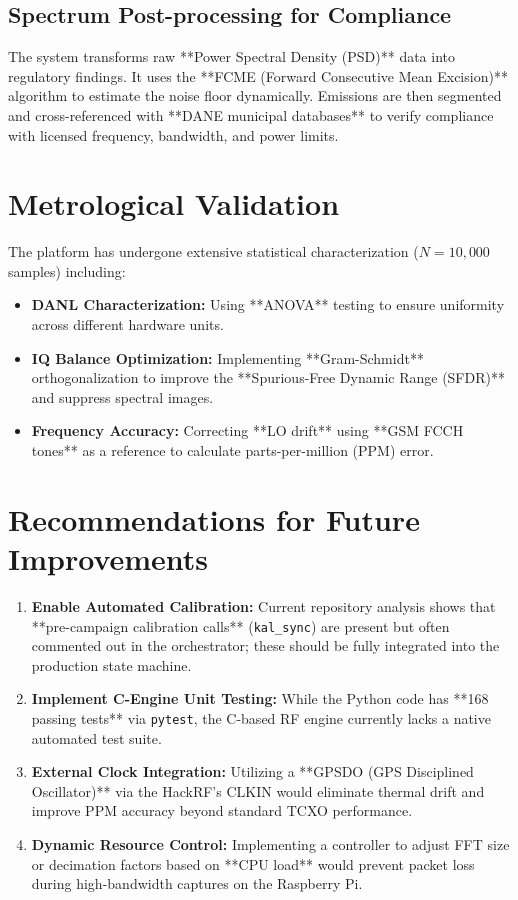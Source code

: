 \documentclass[a4paper,12pt]{article}
\begin{document}
\subsection{Spectrum Post-processing for Compliance}
The system transforms raw **Power Spectral Density (PSD)** data into regulatory findings. It uses the **FCME (Forward Consecutive Mean Excision)** algorithm to estimate the noise floor dynamically. Emissions are then segmented and cross-referenced with **DANE municipal databases** to verify compliance with licensed frequency, bandwidth, and power limits.

\section{Metrological Validation}
The platform has undergone extensive statistical characterization ($N=10,000$ samples) including:
\begin{itemize}
    \item \textbf{DANL Characterization:} Using **ANOVA** testing to ensure uniformity across different hardware units.
    \item \textbf{IQ Balance Optimization:} Implementing **Gram-Schmidt** orthogonalization to improve the **Spurious-Free Dynamic Range (SFDR)** and suppress spectral images.
    \item \textbf{Frequency Accuracy:} Correcting **LO drift** using **GSM FCCH tones** as a reference to calculate parts-per-million (PPM) error.
\end{itemize}

\section{Recommendations for Future Improvements}
\begin{enumerate}
    \item \textbf{Enable Automated Calibration:} Current repository analysis shows that **pre-campaign calibration calls** (\texttt{kal\_sync}) are present but often commented out in the orchestrator; these should be fully integrated into the production state machine.
    \item \textbf{Implement C-Engine Unit Testing:} While the Python code has **168 passing tests** via \texttt{pytest}, the C-based RF engine currently lacks a native automated test suite.
    \item \textbf{External Clock Integration:} Utilizing a **GPSDO (GPS Disciplined Oscillator)** via the HackRF's CLKIN would eliminate thermal drift and improve PPM accuracy beyond standard TCXO performance.
    \item \textbf{Dynamic Resource Control:} Implementing a controller to adjust FFT size or decimation factors based on **CPU load** would prevent packet loss during high-bandwidth captures on the Raspberry Pi.
\end{enumerate}
\end{document}
